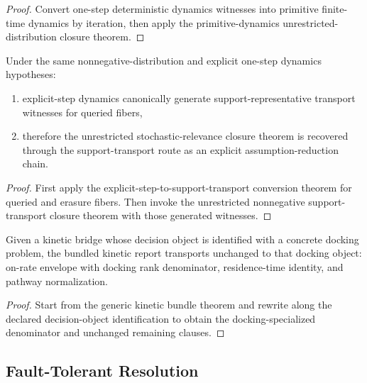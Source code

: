 \begin{proof}
Convert one-step deterministic dynamics witnesses into primitive finite-time dynamics by iteration, then apply the primitive-dynamics unrestricted-distribution closure theorem.
\end{proof}

\begin{theorem}\label{thm:paper4-stochastic-relevance-support-transport-of-explicit-step-dynamics}
Under the same nonnegative-distribution and explicit one-step dynamics hypotheses:
\begin{enumerate}
\item explicit-step dynamics canonically generate support-representative transport witnesses for queried fibers,
\item therefore the unrestricted stochastic-relevance closure theorem is recovered through the support-transport route as an explicit assumption-reduction chain.
\end{enumerate}
\end{theorem}

\begin{proof}
First apply the explicit-step-to-support-transport conversion theorem for queried and erasure fibers. Then invoke the unrestricted nonnegative support-transport closure theorem with those generated witnesses.
\end{proof}

\begin{theorem}\label{thm:concrete-docking-kinetic-bundle-specialization}
Given a kinetic bridge whose decision object is identified with a concrete docking problem, the bundled kinetic report transports unchanged to that docking object: on-rate envelope with docking rank denominator, residence-time identity, and pathway normalization.
\end{theorem}

\begin{proof}
Start from the generic kinetic bundle theorem and rewrite along the declared decision-object identification to obtain the docking-specialized denominator and unchanged remaining clauses.
\end{proof}

\subsection{Fault-Tolerant Resolution}

